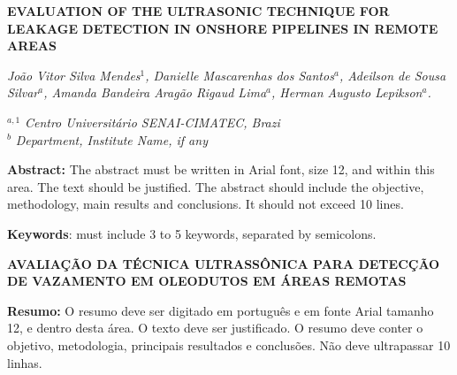 \documentclass[
	article,			%
	12pt,				%
	oneside,			%
	a4paper,			%
	english,			%
	brazil,				%
	sumario=tradicional
	]{abntex2}
\begin{document}
\pagestyle{meuestilo}
\frenchspacing 
\pretextual
\pagestyle{meuestilo}




   \vspace*{2pt}

   \noindent
   \textbf{\large{EVALUATION OF THE ULTRASONIC TECHNIQUE FOR LEAKAGE DETECTION IN ONSHORE PIPELINES IN REMOTE AREAS}}
  
   \vspace{\onelineskip}
   \noindent
   \textit{
      João Vitor Silva Mendes$^1$, Danielle Mascarenhas dos Santos$^a$, Adeilson de Sousa Silvar$^a$, Amanda Bandeira Aragão Rigaud Lima$^a$, 
      Herman Augusto Lepikson$^a$.
   }
   \vspace{\onelineskip}

   \noindent
   $^{a, 1}$ \textit{Centro Universitário SENAI-CIMATEC, Brazi}\\
   $^b$ \textit{Department, Institute Name, if any}

   \vspace*{1.2cm}
   \noindent
   \normalsize
   \textbf{Abstract:} The abstract must be written in Arial font, size 12, and within this area. The text should be justified. The abstract should include the objective, methodology, main results and conclusions. It should not exceed 10 lines.

   \vspace{\onelineskip}
   \noindent
   \textbf{Keywords}: must include 3 to 5 keywords, separated by semicolons.


   \vspace*{1.5cm}
   \noindent
   \textbf{\large{AVALIAÇÃO DA TÉCNICA ULTRASSÔNICA PARA DETECÇÃO DE VAZAMENTO EM OLEODUTOS EM ÁREAS REMOTAS}}

   \vspace{\onelineskip}
   \noindent
   \normalsize
   \textbf{Resumo:} O resumo deve ser digitado em português e em fonte Arial tamanho 12, e dentro desta área. O texto deve ser justificado. O resumo deve conter o objetivo, metodologia, principais resultados e conclusões. Não deve ultrapassar 10 linhas.
\end{document}
